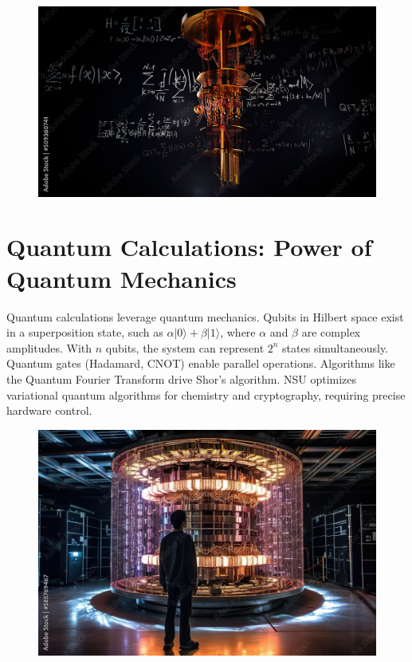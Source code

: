 \documentclass[a4paper,10pt,twocolumn]{memoir}
\begin{document}
\begin{figure}[ht]
  \centering
  \includegraphics[width=\columnwidth]{QC-2.png}
  \caption{}
  \label{fig2}
\end{figure}


\section*{Quantum Calculations: Power of Quantum Mechanics}
Quantum calculations leverage quantum mechanics. Qubits in Hilbert space exist in a superposition state, such as $\alpha|0\rangle + \beta|1\rangle$, where $\alpha$ and $\beta$ are complex amplitudes. With $n$ qubits, the system can represent $2^n$ states simultaneously. Quantum gates (Hadamard, CNOT) enable parallel operations. Algorithms like the Quantum Fourier Transform drive Shor's algorithm. NSU optimizes variational quantum algorithms for chemistry and cryptography, requiring precise hardware control.


\begin{figure}[ht]
  \centering
  \includegraphics[width=\columnwidth]{QC-3.jpeg}
  \caption{}
  \label{fig3}
\end{figure}
\end{document}
